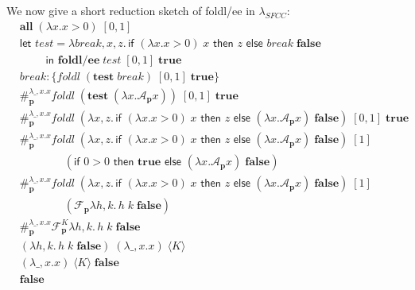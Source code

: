 \documentclass[11pt]{article}
\newcommand{\maybePage}{\newpage}
\newcommand\x{\lambda x}
\newcommand{\letin}[2]{\textsf{let }#1\textsf{ in }#2}
\newcommand\F{\mathcal{F}}
\newcommand\A{\mathcal{A}}
\newcommand{\angles}[1]{\langle#1\rangle}
\begin{document}
We now give a short reduction sketch of foldl/ee in $\lambda_{SFCC}$:
\begin{align*}
&\textbf{all}\;(\x.x>0)\;[0, 1] \\
%
&\letin{test =
	\lambda break,x,z.\,\textsf{if }(\x.x>0)\;x
	\textsf{ then }z\textsf{ else }break\;\textbf{false}
\\&\qquad}{\textbf{foldl/ee}\;test\;[0,1]\;\textbf{true}} \\
%
&break\!: \{foldl\;(\textbf{test}\;break)\;[0,1]\;\textbf{true}\} \\
%
&\#_\textbf{p}^{\lambda\_,x.x}
	foldl\;(\textbf{test}\;(\x.\A_\textbf{p}x))\;[0,1]\;\textbf{true} \\
%
&\#_\textbf{p}^{\lambda\_,x.x}
	foldl\;(\x,z.\,\textsf{if }(\x.x>0)\;x
	\textsf{ then }z\textsf{ else }(\x.\A_\textbf{p}x)\;\textbf{false})\;[0,1]\;\textbf{true} \\
%
&\#_\textbf{p}^{\lambda\_,x.x}
	foldl\;(\x,z.\,\textsf{if }(\x.x>0)\;x
	\textsf{ then }z\textsf{ else }(\x.\A_\textbf{p}x)\;\textbf{false})\;[1] \\
		&\qquad\qquad(\textsf{if }0>0\textsf{ then }\textbf{true}\textsf{ else }(\x.\A_\textbf{p}x)\;\textbf{false}) \\
%
&\#_\textbf{p}^{\lambda\_,x.x}
	foldl\;(\x,z.\,\textsf{if }(\x.x>0)\;x
	\textsf{ then }z\textsf{ else }(\x.\A_\textbf{p}x)\;\textbf{false})\;[1] \\
		&\qquad\qquad(\F_\textbf{p}\lambda h,k.\,h\;k\;\textbf{false}) \\
%
&\#_\textbf{p}^{\lambda\_,x.x}\F_\textbf{p}^K\lambda h,k.\,h\;k\;\textbf{false} \\
%
&(\lambda h,k.\,h\;k\;\textbf{false})\;(\lambda\_,x.x)\;\angles K \\
%
&(\lambda\_,x.x)\;\angles K\;\textbf{false} \\
%
&\textbf{false} \\
\end{align*}


%
%
\end{document}
